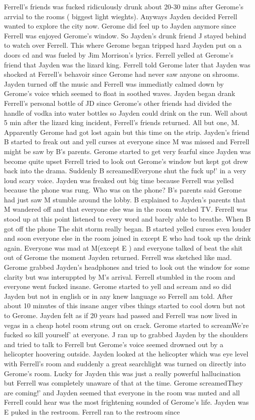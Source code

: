 \documentclass[12pt]{book}
\begin{document}
Ferrell's friends was fucked ridiculously drunk about 20-30 mins after Gerome's arrvial to the rooms ( biggest light wieghts). Anyways Jayden decided Ferrell wanted to explore the city now. Gerome did feel up to Jayden anymore since Ferrell was enjoyed Gerome's window. So Jayden's drunk friend J stayed behind to watch over Ferrell. This where Gerome began tripped hard Jayden put on a doors cd and was fueled by Jim Morrison's lyrics. Ferrell yelled at Gerome's friend that Jayden was the lizard king. Ferrell told Gerome later that Jayden was shocked at Ferrell's behavoir since Gerome had never saw anyone on shrooms. Jayden turned off the music and Ferrell was immediatly calmed down by Gerome's voice which seemed to float in soothed waves. Jayden began drank Ferrell's personal bottle of JD since Gerome's other friends had divided the handle of vodka into water bottles so Jayden could drink on the run. Well about 5 min after the lizard king incident, Ferrell's friends returned. All but one, M. Apparently Gerome had got lost again but this time on the strip. Jayden's friend B started to freak out and yell curses at everyone since M was missed and Ferrell might be saw by B's parents. Gerome started to get very fearful since Jayden was become quite upset Ferrell tried to look out Gerome's window but kept got drew back into the drama. Suddenly B screamedEveryone shut the fuck up!' in a very loud scary voice. Jayden was freaked out big time because Ferrell was yelled because the phone was rung. Who was on the phone? B's parents said Gerome had just saw M stumble around the lobby. B explained to Jayden's parents that M wandered off and that everyone else was in the room watched TV. Ferrell was stood up at this point listened to every word and barely able to breathe. When B got off the phone The shit storm really began. B started yelled curses even louder and soon everyone else in the room joined in except E who had took up the drink again. Everyone was mad at M(except E ) and everyone talked of beat the shit out of Gerome the moment Jayden returned. Ferrell was sketched like mad. Gerome grabbed Jayden's headphones and tried to look out the window for some clarity but was interuppted by M's arrival. Ferrell stumbled in the room and everyone went fucked insane. Gerome started to yell and scream and so did Jayden but not in english or in any knew language so Ferrell am told. After about 10 minutes of this insane anger vibes things started to cool down but not to Gerome. Jayden felt as if 20 years had passed and Ferrell was now lived in vegas in a cheap hotel room strung out on crack. Gerome started to screamWe're fucked so kill yourself' at everyone. J ran up to grabbed Jayden by the shoulders and tried to talk to Ferrell but Gerome's voice seemed drowned out by a helicopter hoovering outside. Jayden looked at the helicopter which was eye level with Ferrell's room and suddenly a great searchlight was turned on directly into Gerome's room. Lucky for Jayden this was just a really powerful hallucination but Ferrell was completely unaware of that at the time. Gerome screamedThey are coming!' and Jayden seemed that everyone in the room was muted and all Ferrell could hear was the most frightening sounded of Gerome's life. Jayden was E puked in the restroom. Ferrell ran to the restroom since 
\end{document}
